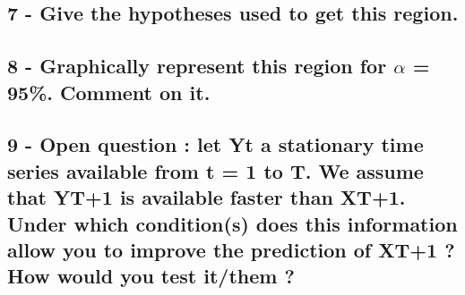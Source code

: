\documentclass[
]{article}
\begin{document}
\hypertarget{give-the-hypotheses-used-to-get-this-region.}{%
\subsection{7 - Give the hypotheses used to get this
region.}\label{give-the-hypotheses-used-to-get-this-region.}}

\hypertarget{graphically-represent-this-region-for-alpha-95.-comment-on-it.}{%
\subsection{\texorpdfstring{8 - Graphically represent this region for
\(\alpha\) = 95\%. Comment on
it.}{8 - Graphically represent this region for \textbackslash alpha = 95\%. Comment on it.}}\label{graphically-represent-this-region-for-alpha-95.-comment-on-it.}}

\hypertarget{open-question-let-yt-a-stationary-time-series-available-from-t-1-to-t.-we-assume-that-yt1-is-available-faster-than-xt1.-under-which-conditions-does-this-information-allow-you-to-improve-the-prediction-of-xt1-how-would-you-test-itthem}{%
\subsection{9 - Open question : let Yt a stationary time series
available from t = 1 to T. We assume that YT+1 is available faster than
XT+1. Under which condition(s) does this information allow you to
improve the prediction of XT+1 ? How would you test it/them
?}\label{open-question-let-yt-a-stationary-time-series-available-from-t-1-to-t.-we-assume-that-yt1-is-available-faster-than-xt1.-under-which-conditions-does-this-information-allow-you-to-improve-the-prediction-of-xt1-how-would-you-test-itthem}}
\end{document}
